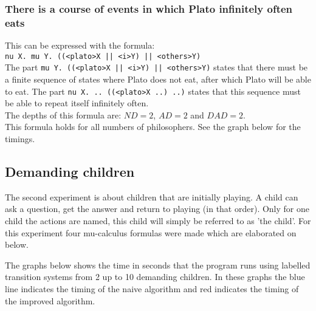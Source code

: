 \documentclass[10pt,a4paper]{article}
\begin{document}
\subsubsection{There is a course of events in which Plato infinitely often eats}
This can be expressed with the formula:\\
{\tt nu X. mu Y. ((<plato>X || <i>Y) || <others>Y)}\\
The part {\tt mu Y. ((<plato>X || <i>Y) || <others>Y)} states that there must be a finite sequence of states where Plato does not eat, after which Plato will be able to eat. The part {\tt nu X. .. ((<plato>X ..) ..)} states that this sequence must be able to repeat itself infinitely often.\\
The depths of this formula are: $ND = 2$, $AD = 2$ and $DAD = 2$.\\
This formula holds for all numbers of philosophers. See the graph below for the timings.\\


\subsection{Demanding children}
The second experiment is about children that are initially playing. A child can ask a question, get the answer and return to playing (in that order). Only for one child the actions are named, this child will simply be referred to as 'the child'. For this experiment four mu-calculus formulas were made which are elaborated on below.

The graphs below shows the time in seconds that the program runs using labelled transition systems from 2 up to 10 demanding children. In these graphs the blue line indicates the timing of the naive algorithm and red indicates the timing of the improved algorithm.
\end{document}
